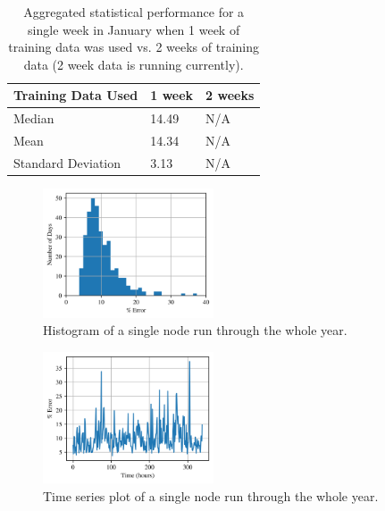 \documentclass[sigconf]{acmart}
\begin{document}


\begin{table}[h]
\begin{tabular}{lll}
\hline
Training Data Used & 1 week & 2 weeks \\
\hline
Median             & 14.49  & N/A     \\
Mean               & 14.34  & N/A     \\
Standard Deviation & 3.13   & N/A    \\
\hline
\end{tabular}
\caption{Aggregated statistical performance for a single week in January when 1 week of training data was used vs. 2 weeks of training data (2 week data is running currently).}
\label{tab:all_nodes}
\end{table}

\begin{figure}[h]
\includegraphics[width=0.45\textwidth]{fig_7.png}
\caption{Histogram of a single node run through the whole year.}
\label{fig:hist_single}
\end{figure}

\begin{figure}[h]
\includegraphics[width=0.45\textwidth]{fig_8.png}
\caption{Time series plot of a single node run through the whole year.}
\label{fig:time_single}
\end{figure}
\end{document}
